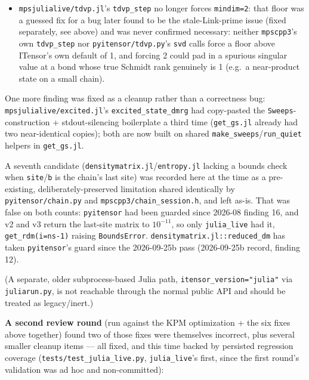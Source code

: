 \documentclass[11pt]{article}
\begin{document}
\begin{itemize}
  own existing pattern, and \texttt{mpscpp3/chain\_session.h}'s
  \texttt{tdvp\_step}, which passes \texttt{"DoNormalize",true}) ---
  \texttt{tdvp\_step}'s own \texttt{normalize=false} stays unchanged,
  since \texttt{tdz.py}'s \texttt{advance\_complex\_time\_step} also
  calls \texttt{tdvp\_step} directly and its physically-meaningful norm
  decay (the whole point of TDZ's damping mechanism, arXiv:2311.10909)
  must not be renormalized away.
\item \texttt{mpsjulialive/tdvp.jl}'s \texttt{tdvp\_step} no longer forces
  \texttt{mindim=2}: that floor was a guessed fix for a bug later found
  to be the stale-Link-prime issue (fixed separately, see above) and was
  never confirmed necessary: neither \texttt{mpscpp3}'s own
  \texttt{tdvp\_step} nor \texttt{pyitensor/tdvp.py}'s \texttt{svd} calls
  force a floor above ITensor's own default of 1, and forcing 2 could pad
  in a spurious singular value at a bond whose true Schmidt rank
  genuinely is 1 (e.g.\ a near-product state on a small chain).
\end{itemize}

One more finding was fixed as a cleanup rather than a correctness bug:
\texttt{mpsjulialive/excited.jl}'s \texttt{excited\_state\_dmrg} had
copy-pasted the \texttt{Sweeps}-construction + stdout-silencing
boilerplate a third time (\texttt{get\_gs.jl} already had two
near-identical copies); both are now built on shared
\texttt{make\_sweeps}/\texttt{run\_quiet} helpers in \texttt{get\_gs.jl}.

A seventh candidate (\texttt{densitymatrix.jl}/\texttt{entropy.jl}
lacking a bounds check when \texttt{site}/\texttt{b} is the chain's last
site) was recorded here at the time as a pre-existing,
deliberately-preserved limitation shared identically by
\texttt{pyitensor/chain.py} and \texttt{mpscpp3/chain\_session.h}, and
left as-is. That was false on both counts: \texttt{pyitensor} had been
guarded since 2026-08 finding 16, and v2 and v3 return the last-site
matrix to $10^{-11}$, so only \texttt{julia\_live} had it,
\texttt{get\_rdm(i=ns-1)} raising \texttt{BoundsError}.
\texttt{densitymatrix.jl::reduced\_dm} has taken \texttt{pyitensor}'s
guard since the 2026-09-25b pass (2026-09-25b record, finding 12).

(A separate, older subprocess-based Julia path,
\texttt{itensor\_version="julia"} via \texttt{juliarun.py}, is not
reachable through the normal public API and should be treated as
legacy/inert.)

\textbf{A second review round} (run against the KPM optimization + the
six fixes above together) found two of those fixes were themselves
incorrect, plus several smaller cleanup items --- all fixed, and this
time backed by persisted regression coverage
(\texttt{tests/test\_julia\_live.py}, \texttt{julia\_live}'s first,
since the first round's validation was ad hoc and non-committed):
\end{document}
